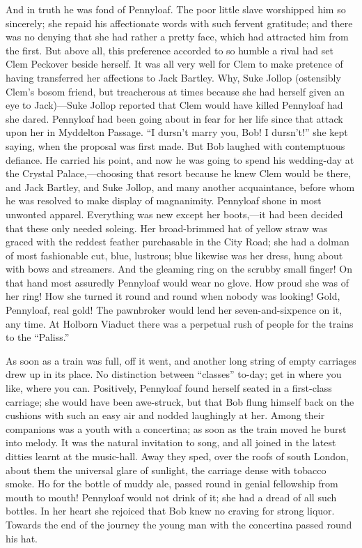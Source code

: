 And in truth he was fond of Pennyloaf. The poor little slave worshipped
him so sincerely; she repaid his affectionate words with such fervent
gratitude; and there was no denying that she had rather a pretty face,
which had attracted him from the first. But above all, this preference
accorded to so humble a rival had set Clem Peckover beside herself. It
was all very well for Clem to make pretence of having transferred her
{\protect\hypertarget{255}{}{}}affections to Jack Bartley. Why, Suke
Jollop (ostensibly Clem's bosom friend, but treacherous at times because
she had herself given an eye to Jack)---Suke Jollop reported that Clem
would have killed Pennyloaf had she dared. Pennyloaf had been going
about in fear for her life since that attack upon her in Myddelton
Passage. ``I dursn't marry you, Bob! I dursn't!'' she kept saying, when
the proposal was first made. But Bob laughed with contemptuous defiance.
He carried his point, and now he was going to spend his wedding-day at
the Crystal Palace,---choosing that resort because he knew Clem would be
there, and Jack Bartley, and Suke Jollop, and many another acquaintance,
before whom he was resolved to make display of magnanimity. Pennyloaf
shone in most unwonted apparel. Everything was new except her
boots,---it had been decided that these only needed soleing. Her
broad-brimmed hat of yellow straw was graced with the reddest feather
purchasable in the City Road; she had a dolman of most fashionable cut,
blue, lustrous; blue {\protect\hypertarget{256}{}{}}likewise was her
dress, hung about with bows and streamers. And the gleaming ring on the
scrubby small finger! On that hand most assuredly Pennyloaf would wear
no glove. How proud she was of her ring! How she turned it round and
round when nobody was looking! Gold, Pennyloaf, real gold! The
pawnbroker would lend her seven-and-sixpence on it, any time. At Holborn
Viaduct there was a perpetual rush of people for the trains to the
``Paliss.''

As soon as a train was full, off it went, and another long string of
empty carriages drew up in its place. No distinction between ``classes''
to-day; get in where you like, where you can. Positively, Pennyloaf
found herself seated in a first-class carriage; she would have been
awe-struck, but that Bob flung himself back on the cushions with such an
easy air and nodded laughingly at her. Among their companions was a
youth with a concertina; as soon as the train moved he burst into
melody. It was the natural invitation to song, and all joined in the
latest {\protect\hypertarget{257}{}{}}ditties learnt at the music-hall.
Away they sped, over the roofs of south London, about them the universal
glare of sunlight, the carriage dense with tobacco smoke. Ho for the
bottle of muddy ale, passed round in genial fellowship from mouth to
mouth! Pennyloaf would not drink of it; she had a dread of all such
bottles. In her heart she rejoiced that Bob knew no craving for strong
liquor. Towards the end of the journey the young man with the concertina
passed round his hat.

